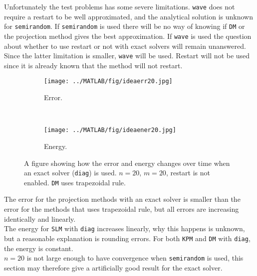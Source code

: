 \noindent Unfortunately the test problems has some severe limitations. \texttt{wave} does not require a restart to be well approximated, and the analytical solution is unknown for \texttt{semirandom}. 
If \texttt{semirandom} is used there will be no way of knowing if \texttt{DM} or the projection method gives the best approximation.
If \texttt{wave} is used the question about whether to use restart or not with exact solvers will remain unanswered. 
Since the latter limitation is smaller,
\texttt{wave} will be used. Restart will not be used since it is already known that the method will not restart.

\begin{figure}[H]
        \centering
        \begin{subfigure}[b]{0.45\textwidth}
                \texttt{[image: ../MATLAB/fig/ideaerr20.jpg]}
                \caption{ Error. }
                \label{fig:ideaerr20}
        \end{subfigure}%
        ~
        \begin{subfigure}[b]{0.45\textwidth}
                \texttt{[image: ../MATLAB/fig/ideaener20.jpg]}
                \caption{ Energy. }
                \label{fig:ideaener20}
        \end{subfigure}
        \caption{ A figure showing how the error and energy changes over time when an exact solver (\texttt{diag}) is used. $n = 20$, $m = 20$, restart is not enabled. \texttt{DM} uses trapezoidal rule.  }
        \label{fig:idea0}
\end{figure}
\noindent The error for the projection methods with an exact solver is smaller than the error for the methods that uses trapezoidal rule, but all errors are increasing identically and linearly. \\
The energy for \texttt{SLM} with \texttt{diag} increases linearly, why this happens is unknown, but a reasonable explanation is rounding errors. For both \texttt{KPM} and \texttt{DM} with \texttt{diag}, the energy is constant.\\

\noindent $n = 20$ is not large enough to have convergence when \texttt{semirandom} is used, this section may therefore give a artificially good result for the exact solver.

